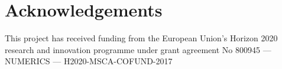 \chapter*{Acknowledgements}
This project has received funding from the European Union's Horizon 2020 research and innovation programme under grant agreement No 800945 — NUMERICS — H2020-MSCA-COFUND-2017




